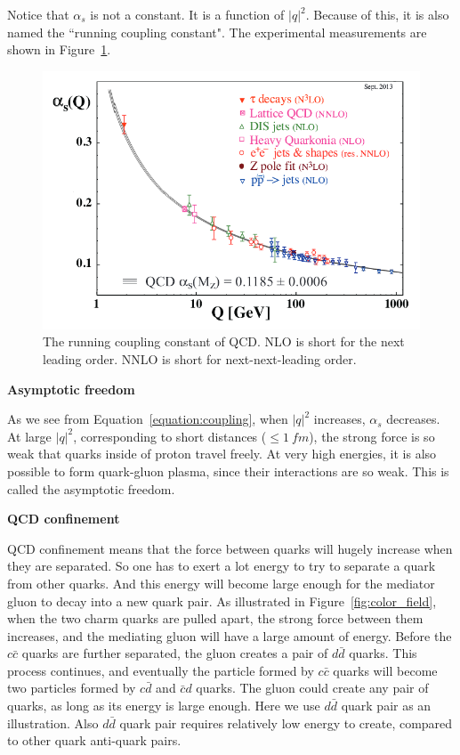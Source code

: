 Notice that $\alpha_{s}$ is not a constant. It is a function of $|q|^2$. Because of this, it is also 
named the ``running coupling constant".  The experimental measurements are shown 
in Figure~\ref{figs:coupling}.

\begin{figure}[htb]
\centering
\includegraphics[width=.7\textwidth]{figures/alphasrunning.png}
\caption{The running coupling constant of QCD. NLO is short for the next leading order.
NNLO is short for next-next-leading order.}
\label{figs:coupling}
\end{figure}  

 
{\bf Asymptotic freedom}

As we see from Equation~\ref{equation:coupling}, 
when $|q|^2$ increases, $\alpha_{s}$ decreases. 
At  large $|q|^2$, corresponding to
short distances (${\leq}1~fm$),  the strong force 
is so weak that quarks inside of proton travel freely.  At very high energies, 
it is also possible to form quark-gluon plasma, since their interactions are so weak. 
This is called the asymptotic freedom. 

{\bf QCD confinement}


QCD confinement means that the force between quarks will hugely increase when they are separated. 
So one has to exert a lot energy to try to separate a quark from other quarks. And this energy will
become large enough for the mediator gluon to decay into a new quark pair. 
As illustrated in Figure~\ref{fig:color_field},  when the two charm quarks are pulled apart, the 
strong force between them increases, and the mediating gluon will have 
a large amount of energy. Before the $c\bar{c}$ quarks are further separated, the gluon  
creates a pair of $d\bar{d}$ quarks. This process continues,  and eventually the particle formed by 
$c\bar{c}$ quarks will become 
two particles formed by $c\bar{d}$ and $\bar{c}d$ quarks.
The gluon could create any pair of quarks, 
as long as its energy is large enough. Here we use $d\bar{d}$ quark pair as an illustration. 
Also $d\bar{d}$ quark pair requires relatively low energy to create, compared to other quark anti-quark pairs. 

